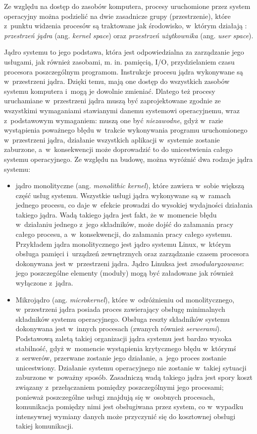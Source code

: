 \documentclass[12pt]{mwart}
\begin{document}
%
\indent
	Ze względu na dostęp do zasobów komputera, procesy uruchomione przez system operacyjny można podzielić 
	na dwie zasadnicze grupy (przestrzenie), które z~punktu widzenia procesów są traktowane jak środowisko, w~którym działają : 
	\emph{przestrzeń jądra} (ang. \emph{kernel space}) oraz \emph{przestrzeń użytkownika} (ang. \emph{user space}).
\par
%
\indent
	Jądro systemu to jego podstawa, która jest odpowiedzialna za zarządzanie jego usługami, jak również zasobami, m. in. pamięcią, I/O,
	przydzielaniem czasu procesora poszczególnym programom. Instrukcje procesu jądra wykonywane są w~przestrzeni jądra. Dzięki temu,
	mają one dostęp do wszystkich zasobów systemu komputera i~mogą je dowolnie zmieniać. Dlatego też procesy uruchamiane w~przestrzeni
	jądra muszą być zaprojektowane zgodnie ze wszystkimi wymaganiami stawianymi danemu systemowi operacyjnemu, wraz z~podstawowym wymaganiem:
	muszą one być \emph{niezawodne}, gdyż w~razie wystąpienia poważnego błędu w~trakcie wykonywania programu uruchomionego w~przestrzeni jądra,
	działanie wszystkich aplikacji w~systemie zostanie zaburzone, a~w~konsekwencji może doprowadzić to do unicestwienia całego systemu operacyjnego.
	Ze względu na budowę, można wyróżnić dwa rodzaje jądra systemu:
	\begin{itemize}
		\item jądro monolityczne (ang. \emph{monolithic kernel}), które zawiera w~sobie większą część usług systemu. Wszystkie usługi jądra
			wykonywane są w~ramach jednego procesu, co daje w~efekcie prowadzi do wysokiej wydajności działania takiego jądra. Wadą takiego jądra
			jest fakt, że w~momencie błędu w~działaniu jednego z~jego składników, może dojść do załamania pracy całego procesu, a~w~konsekwencji,
			do załamania pracy całego systemu.
			Przykładem jądra monolitycznego jest jądro systemu Linux, w~którym obsługa pamięci i~urządzeń zewnętrznych oraz zarządzanie czasem procesora
			dokonywana jest w~przestrzeni jądra. Jądro Linuksa jest \emph{zmodularyzowane}: jego poszczególne elementy (moduły) mogą być załadowane
			jak również wyłączone z~jądra.
		\item Mikrojądro (ang. \emph{microkernel}), które w~odróżnieniu od monolitycznego, w~przestrzeni jądra posiada proces zawierający
			obsługę minimalnych składników systemu operacyjnego. Obsługa reszty składników systemu dokonywana jest w~innych procesach
			(zwanych również \emph{serwerami}). Podstawową zaletą takiej organizacji jądra systemu jest bardzo wysoka stabilność, gdyż w~momencie
			wystąpienia krytycznego błędu w~którymś z~serwerów, przerwane zostanie jego działanie, a~jego proces zostanie unicestwiony.
			Działanie systemu operacyjnego nie zostanie w~takiej sytuacji
			zaburzone w~poważny sposób. Zasadniczą wadą takiego jądra jest spory koszt związany z~przełączaniem pomiędzy poszczególnymi jego procesami;
			ponieważ poszczególne usługi znajdują się w~osobnych procesach, komunikacja pomiędzy nimi jest obsługiwana przez system, co
			w~wypadku intensywnej wymiany danych może przyczynić się do kosztownej obsługi takiej komunikacji.
	\end{itemize}
\end{document}
